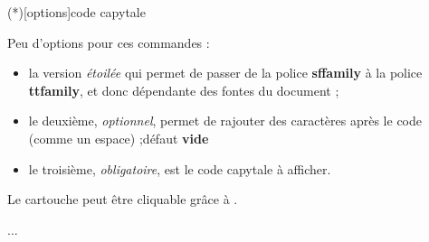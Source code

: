 \documentclass[a4paper,french,11pt]{article}
\newcommand\ctex[1]{\tcbox[vignettelatex]{#1}}
\newcommand\Cle[1]{{\bfseries\sffamily\textlangle #1\textrangle}}
\begin{document}
\begin{codetex}
\CartoucheCapytale(*)[options]{code capytale}
\end{codetex}

\begin{codecles}
Peu d'options pour ces commandes :

\begin{itemize}
	\item la version \textit{étoilée} qui permet de  passer de la police \Cle{sffamily} à la police \Cle{ttfamily}, et donc dépendante des fontes du document ;
	\item le deuxième, \textit{optionnel}, permet de rajouter des caractères après le code (comme un \textsf{espace}) ;\hfill{}défaut \Cle{vide}
	\item le troisième, \textit{obligatoire}, est le \textsf{code capytale} à afficher.
\end{itemize}
\end{codecles}

\begin{codetex}



\end{codetex}

\begin{codesortie}



\end{codesortie}

\begin{codeinfo}
Le \textsf{cartouche} peut être \og cliquable \fg{} grâce à \ctex{href}.
\end{codeinfo}

\begin{codetex}
\usepackage{hyperref}
...
\href{https://capytale2.ac-paris.fr/web/c/abcd-12345}{}
\end{codetex}

\begin{codesortie}
\href{https://capytale2.ac-paris.fr/web/c/abcd-12345}{}
\end{codesortie}
\end{document}
